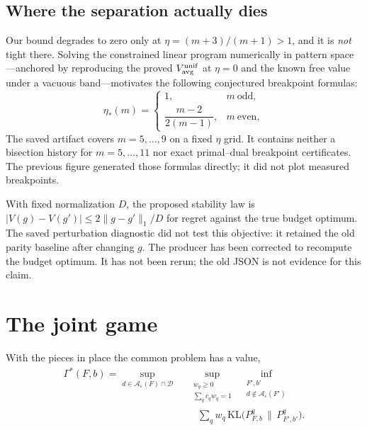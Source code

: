 
\subsection{Where the separation actually dies}

Our bound degrades to zero only at $\eta=(m+3)/(m+1)>1$, and it is \emph{not} tight there.
Solving the constrained linear program numerically in pattern space---anchored by reproducing
the proved $V^{\rm unif}_{\rm avg}$ at $\eta=0$ and the known free value under a vacuous
band---motivates the following conjectured breakpoint formulas:
\begin{equation}
\eta_{*}(m)=
\begin{cases}
1, & m\ \text{odd},\\[2pt]
\dfrac{m-2}{2(m-1)}, & m\ \text{even},
\end{cases}
\label{eq:breakpoint}
\end{equation}
The saved artifact covers $m=5,\dots,9$ on a fixed $\eta$ grid. It contains neither
a bisection history for $m=5,\dots,11$ nor exact primal--dual breakpoint certificates.
The previous figure generated those formulas directly; it did not plot measured breakpoints.


With fixed normalization $D$, the proposed stability law is
$|V(g)-V(g')|\le2\|g-g'\|_1/D$ for regret against the true budget optimum.
The saved perturbation diagnostic did not test this objective: it retained the old parity
baseline after changing $g$. The producer has been corrected to recompute the budget
optimum. It has not been rerun; the old JSON is not evidence for this claim.

\section{The joint game}
\label{sec:joint}

With the pieces in place the common problem has a value,
\begin{equation}
\begin{aligned}
\Gamma^{*}(F,b)=\sup_{d\in\mathcal{A}_{\varepsilon}(F)\cap\mathcal{D}}\ \,
&\sup_{\substack{w_{q}\ge0\\ \sum_{q}c_{q}w_{q}=1}}\ \,
\inf_{\substack{F',b'\\ d\notin\mathcal{A}_{\varepsilon}(F')}}\\[-2pt]
&\quad\sum_{q}w_{q}\,\mathrm{KL}\bigl(P^{q}_{F,b}\,\|\,P^{q}_{F',b'}\bigr).
\end{aligned}
\label{eq:jointgame}
\end{equation}

